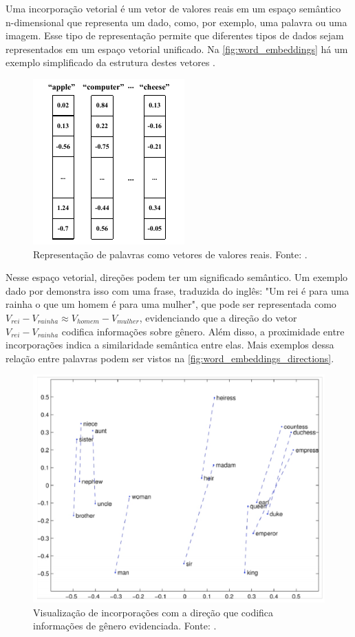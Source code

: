 Uma incorporação vetorial é um vetor de valores reais em um espaço semântico n-dimensional que representa um dado, como, por exemplo, uma palavra ou uma imagem. Esse
tipo de representação permite que diferentes tipos de dados sejam representados em um espaço vetorial unificado. Na \autoref{fig:word_embeddings} há um exemplo
simplificado da estrutura destes vetores \cite{word_embedding, mllm_survey_2023}.

\begin{figure}[ht]
      \centering
      \includegraphics[width=0.4\columnwidth,keepaspectratio]{images/word_embeddings.pdf}
      \caption{\small Representação de palavras como vetores de valores reais. Fonte: \textcite{word_embedding}.}
      \label{fig:word_embeddings}
\end{figure}

Nesse espaço vetorial, direções podem ter um significado semântico. Um exemplo dado por \textcite{glove} demonstra isso com uma frase, traduzida do inglês: "Um rei é para
uma rainha o que um homem é para uma mulher", que pode ser representada como \textit{$V_{rei} - V_{rainha} \approx V_{homem} - V_{mulher}$}, evidenciando que a direção do
vetor \textit{$V_{rei} - V_{rainha}$} codifica informações sobre gênero. Além disso, a proximidade entre incorporações indica a similaridade semântica entre elas. Mais
exemplos dessa relação entre palavras podem ser vistos na \autoref{fig:word_embeddings_directions}.

\begin{figure}[ht]
      \centering
      \includegraphics[width=0.7\columnwidth,keepaspectratio]{images/word_embeddings_directions.png}
      \caption{\small Visualização de incorporações com a direção que codifica informações de gênero evidenciada. Fonte: \textcite{word_embedding}.}
      \label{fig:word_embeddings_directions}
\end{figure}

